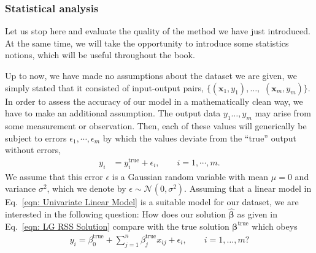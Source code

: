 \subsubsection{Statistical analysis}
Let us stop here and evaluate the quality of the method we have just introduced. At the same time, we will take the opportunity to introduce some statistics notions, which will be useful throughout the book.

Up to now, we have made no assumptions about the dataset we are given, we simply stated that it consisted of input-output pairs, $\{(\bm{x}_{1}, y_{1}), \dots,$ $(\bm{x}_{m}, y_{m})\}$. In order to assess the accuracy of our model in a mathematically clean way, we have to make an additional assumption.
The output data $y_1\ldots, y_m$ may arise from some measurement or observation. Then, each of these values will generically be subject to errors $\epsilon_1,\cdots, \epsilon_m$ by which the values deviate from the ``true'' output without errors,
\begin{equation} \label{eqn: True Linear_b}
\begin{split}
        y_i &= y^{\textrm{true}}_i + \epsilon_i,\qquad i=1,\cdots,m.
\end{split}
\end{equation}
We assume that this error $\epsilon$ is a Gaussian random variable with mean $\mu = 0$ and variance $\sigma^2$, which we denote by $\epsilon \sim \mathcal{N}(0, \sigma^2)$. Assuming that a linear model in Eq.~\eqref{eqn: Univariate Linear Model} is a suitable model for our dataset, we are interested in the following question: How does our solution $\hat{\bm{\beta}}$ as given in Eq.~\eqref{eqn: LG RSS Solution} compare with the true solution $\bm{\beta}^{\textrm{true}}$ which obeys
\begin{equation} \label{eqn: True Linear}
\begin{split}
        y_i = \beta_0^{\textrm{true}} + \sum_{j=1}^{n} \beta_{j}^{\textrm{true}}x_{ij} + \epsilon_i,\qquad
        i=1,\ldots,m?
\end{split}
\end{equation}
  

